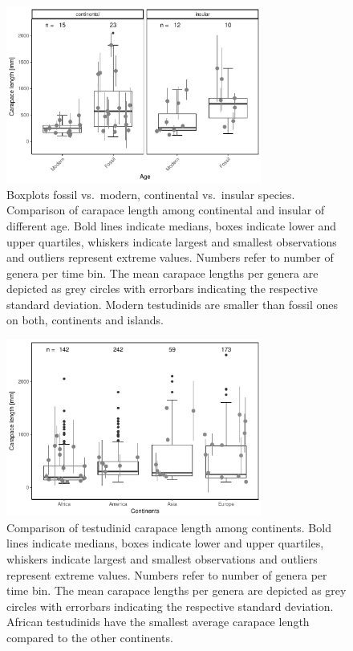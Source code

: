 \begin{figure}[htbp]
	\centering
	\includegraphics[width=0.75\textwidth]{MA_JJ_files/figure-latex/BPFMCI-1.pdf}
	\caption[Comparison of continental and insular testudinids of modern and fossil age]{Boxplots fossil vs.~modern, continental vs.~insular species.
		Comparison of carapace length among continental and insular \T of different age. Bold lines indicate medians, boxes indicate lower and upper quartiles, whiskers indicate largest and smallest observations and outliers represent extreme values. Numbers refer to number of genera per time bin. The mean carapace lengths per genera are depicted as grey circles with errorbars indicating the respective standard deviation. Modern testudinids are smaller than fossil ones on both, continents and islands.}
	\label{BoxFoMCI}
\end{figure}




\begin{figure}[htbp]
	\centering
	\includegraphics[width=0.75\textwidth]{MA_JJ_files/figure-latex/BPCon-1.pdf}
	\caption[Comparison of carapace lengths among continents.]{Comparison of testudinid carapace length among continents. Bold lines indicate medians, boxes indicate lower and upper quartiles, whiskers indicate largest and smallest observations and outliers represent extreme values. Numbers refer to number of genera per time bin. The mean carapace lengths per genera are depicted as grey circles with errorbars indicating the respective standard deviation. African testudinids have the smallest average carapace length compared to the other continents.}
	\label{fig:boxCon}
\end{figure}




